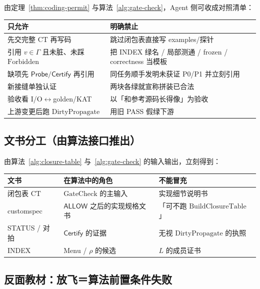 \documentclass[UTF8,a4paper,11pt]{ctexart}
\theoremstyle{definition}
\theoremstyle{plain}
\theoremstyle{remark}
\numberwithin{figure}{section}
\numberwithin{table}{section}
\begin{document}
由定理~\ref{thm:coding-permit} 与算法~\ref{alg:gate-check}，Agent 侧可收成对照清单：

\begin{center}
\begin{tabular}{@{}L{6.6cm}L{7.2cm}@{}}
  \toprule
  只允许 & 明确禁止 \\
  \midrule
  先交完整 $\mathrm{CT}$ 再写码 &
  跳过闭包表直接写 examples/探针 \\
  引用 $v\in\Gamma$ 且未脏、未踩 $\mathrm{Forbidden}$ &
  把 INDEX 绿名 / 局部测通 / frozen / correctness 当模板 \\
  缺项先 $\mathsf{Probe}/\mathsf{Certify}$ 再引用 &
  同任务顺手发明未获证 P0/P1 并立刻引用 \\
  新接缝单独认证 &
  两块各绿就宣称拼装已合法 \\
  验收看 I/O$\leftrightarrow$golden/KAT &
  以「和参考源码长得像」为验收 \\
  上游变更后跑 $\mathrm{DirtyPropagate}$ &
  用旧 PASS 假绿下游 \\
  \bottomrule
\end{tabular}
\end{center}

\subsection{文书分工（由算法接口推出）}
\label{sec:gates-docs}

由算法~\ref{alg:closure-table} 与~\ref{alg:gate-check} 的输入输出，立刻得到：

\begin{center}
\begin{tabular}{@{}L{3.0cm}L{5.4cm}L{5.4cm}@{}}
  \toprule
  文书 & 在算法中的角色 & 不能冒充 \\
  \midrule
  闭包表 $\mathrm{CT}$ &
  $\mathrm{GateCheck}$ 的主输入 &
  实现细节说明书 \\
  customspec &
  $\mathsf{ALLOW}$ 之后的实现规格文书 &
  「可不跑 $\mathrm{BuildClosureTable}$」 \\
  STATUS / 对拍 &
  $\mathsf{Certify}$ 的证据 &
  无视 $\mathrm{DirtyPropagate}$ 的执照 \\
  INDEX &
  $\mathrm{Menu}$ / $\rho$ 的候选 &
  $L$ 的成员证书 \\
  \bottomrule
\end{tabular}
\end{center}

\subsection{反面教材：放飞＝算法前置条件失败}
\label{sec:gates-anti}
\end{document}
